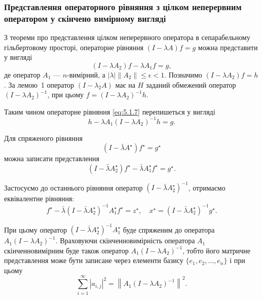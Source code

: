 \subsubsection{Представлення операторного рівняння з цілком неперервним оператором у скінчено вимірному вигляді}

З теореми про представлення цілком неперервного оператора в сепарабельному гільбертовому просторі, операторне рівняння $(I - \lambda A) f = g$ можна представити у вигляді
\begin{equation}
    \label{eq:5.1.7}
    (I - \lambda A_2) f - \lambda A_1 f = g,
\end{equation}
де оператор $A_1$ --- $n$-вимірний, а $|\lambda| \|A_2\| \le \epsilon < 1$. Позначимо $(I - \lambda A_2) f = h$. За лемою~1 оператор $(I - \lambda_2 A)$ має на $H$ заданий обмежений оператор $(I - \lambda A_2)^{-1}$, при цьому $f = (I - \lambda A_2)^{-1} h$. \medskip

Таким чином операторне рівняння \eqref{eq:5.1.7} перепишеться у вигляді
\begin{equation}
    \label{eq:5.1.8}
    h - \lambda A_1 (I - \lambda A_2)^{-1} h = g.
\end{equation}

Для спряженого рівняння
\begin{equation}
    \label{eq:5.1.5'}
    (I - \bar \lambda A^\star) f^\star = g^\star
\end{equation}
можна записати представлення
\begin{equation}
    \label{eq:5.1.7'}
    (I - \bar \lambda A_2^\star) f^\star - \bar \lambda A_1^\star f^\star = g^\star.
\end{equation}

Застосуємо до останнього рівняння оператор $\left( I - \bar \lambda A_2^\star \right)^{-1}$, отримаємо еквівалентне рівняння:
\begin{equation}
    \label{eq:5.1.8'}
    f^\star - \bar \lambda \left( I - \bar \lambda A_2^\star \right)^{-1} A_1^\star f^\star = z^\star, \quad x^\star = \left( I - \bar \lambda A_2^\star \right)^{-1} g^\star.
\end{equation}

При цьому оператор $\left( I - \bar \lambda A_2^\star \right)^{-1} A_1^\star$ буде спряженим до оператора $A_1 (I - \lambda A_2)^{-1}$. Враховуючи скінченновимірність оператора $A_1$ скінченновимірним буде також оператор $A_1 (I - \lambda A_2)^{-1}$, тобто його матричне представлення може бути записане через елементи базису $\{e_1, e_2, \ldots, e_n\}$ і при цьому
\begin{equation*}
    \sum_{i = 1}^\infty |a_{i,j}|^2 = \left\| A_1 (I - \lambda A_2)^{-1} \right\|^2.
\end{equation*}

